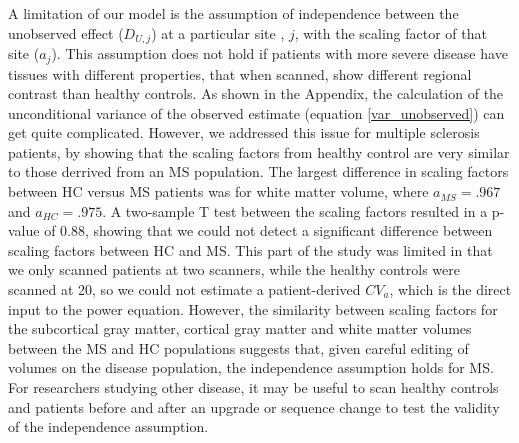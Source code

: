 A limitation of our model is the assumption of independence between the unobserved effect ($D_{U,j}$) at a particular site , $j$, with the scaling factor of that site ($a_j$). This assumption does not hold if patients with more severe disease have tissues with different properties, that when scanned, show different regional contrast than healthy controls. As shown in the Appendix, the calculation of the unconditional variance of the observed estimate (equation \ref{var_unobserved}) can get quite complicated. However, we addressed this issue for multiple sclerosis patients, by showing that the scaling factors from healthy control are very similar to those derrived from an MS population. The largest difference in scaling factors between HC versus MS patients was for white matter volume, where $a_{MS} = .967$ and $a_{HC} = .975$. A two-sample T test between the scaling factors resulted in a p-value of $0.88$, showing that we could not detect a significant difference between scaling factors between HC and MS. This part of the study was limited in that we only scanned patients at two scanners, while the healthy controls were scanned at 20, so we could not estimate a patient-derived $CV_a$, which is the direct input to the power equation. However, the similarity between scaling factors for the subcortical gray matter, cortical gray matter and white matter volumes between the MS and HC populations suggests that, given careful editing of volumes on the disease population, the independence assumption holds for MS. For researchers studying other disease, it may be useful to scan healthy controls and patients before and after an upgrade or sequence change to test the validity of the independence assumption.